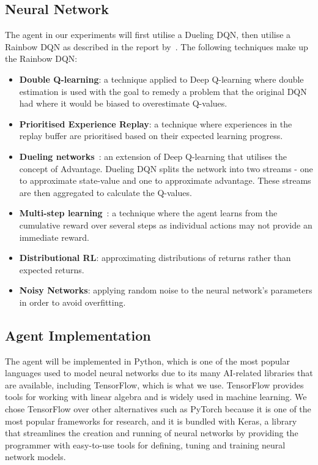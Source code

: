 \documentclass[12pt,a4paper]{article}
\begin{document}
    \subsection{Neural Network}\label{subsec:neural-network}
    The agent in our experiments will first utilise a Dueling DQN, then utilise a Rainbow DQN as described in the report by~\citet{hessel17}.
    The following techniques make up the Rainbow DQN:
    \begin{itemize}
        \item \textbf{Double Q-learning}: a technique applied to Deep Q-learning where double estimation is used
        with the goal to remedy a problem that the original DQN had where it would be biased to overestimate Q-values.
        \item \textbf{Prioritised Experience Replay}: a technique where experiences in the replay buffer are
        prioritised based on their expected learning progress.
        \item \textbf{Dueling networks}~\citep{schaul16}: an extension of Deep Q-learning that utilises the concept of Advantage.
        Dueling DQN splits the network into two streams - one to approximate state-value and one to approximate advantage.
        These streams are then aggregated to calculate the Q-values.
        \item \textbf{Multi-step learning}~\citep[chap.~7.1]{sutton18}: a technique where the agent learns from the cumulative reward over several steps as individual actions may not provide an immediate reward.
        \item \textbf{Distributional RL}: approximating distributions of returns rather than expected returns.
        \item \textbf{Noisy Networks}: applying random noise to the neural network's parameters in order to avoid overfitting.
    \end{itemize}

    \subsection{Agent Implementation}\label{subsec:implementation}
    The agent will be implemented in Python, which is one of the most popular languages used to model neural networks due to its many AI-related libraries that are available, including TensorFlow, which is what we use.
    TensorFlow provides tools for working with linear algebra and is widely used in machine learning.
    We chose TensorFlow over other alternatives such as PyTorch because it is one of the most popular frameworks for research,
    and it is bundled with Keras, a library that streamlines the creation and running of neural networks by providing the programmer with
    easy-to-use tools for defining, tuning and training neural network models.
\end{document}
